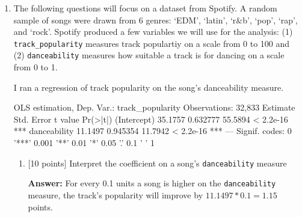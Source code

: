 \documentclass[12pt]{article}
\newcommand{\answer}[1]{{\color{blue_winged_teal}\textbf{Answer:} #1}}
\newcommand{\pts}[1]{{\color{zinc500}[#1 points]}}
\begin{document}
\begin{enumerate}
  \medskip
  \begin{enumerate}[label=(\alph*)]
    \item \pts{10} Form a 95\% confidence interval for the population mean battery life.
    Interpret this interval in words.

    \answer{
      $$\left( 6.6 - 1.96 * \sqrt{\frac{1}{16}}, 6.6 + 1.96 * \sqrt{\frac{1}{16}} \right) = (6.11, 7.09)$$

      With 95\% confidence, the true average battery life falls in the range 6.11 to 7.09 hours.
    }

    \item \pts{10} You suspect that the average battery life is less than the advertised 7 hours.
    Test the null hypothesis that $H_0: \mu = 7$ at the 5\% significance level.

    \answer{
      Since the value 7 falls inside my 95\% confidence interval for the sample mean, I fail to reject the null at the 5\% significance level.
    }
  \end{enumerate}


  \newpage
  \item The following questions will focus on a dataset from Spotify. 
  A random sample of songs were drawn from 6 genres: `EDM', `latin', `r\&b', `pop', `rap', and `rock'.
  Spotify produced a few variables we will use for the analysis: (1) \texttt{track\_popularity} measures track populartiy on a scale from 0 to 100 and (2) \texttt{danceability} measures how suitable a track is for dancing on a scale from 0 to 1.

  I ran a regression of track popularity on the song's danceability measure. 

  \begin{codeblock}[{}]
OLS estimation, Dep. Var.: track_popularity
Observations: 32,833
             Estimate Std. Error t value  Pr(>|t|)    
(Intercept)   35.1757   0.632777 55.5894 < 2.2e-16 ***
danceability  11.1497   0.945354 11.7942 < 2.2e-16 ***
---
Signif. codes:  0 '***' 0.001 '**' 0.01 '*' 0.05 '.' 0.1 ' ' 1
  \end{codeblock}

  \begin{enumerate}
    \item \pts{10} Interpret the coefficient on a song's \texttt{danceability} measure
    
    \answer{For every 0.1 units a song is higher on the \texttt{danceability} measure, the track's popularity will improve by $11.1497 * 0.1 = 1.15$ points.}
    

\end{enumerate}
\end{enumerate}
\end{document}
